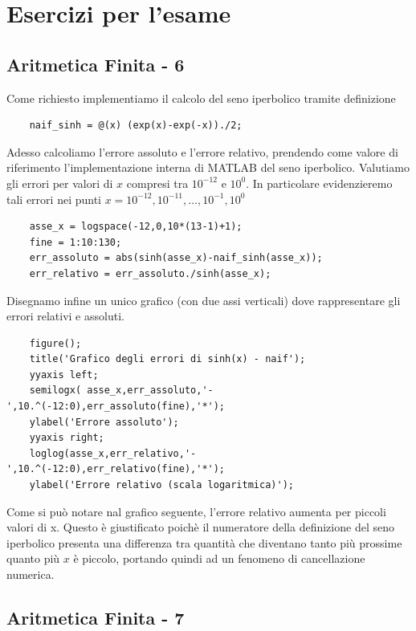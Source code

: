 \documentclass{article}
\begin{document}
\section*{Esercizi per l'esame}

\subsection*{Aritmetica Finita - 6}

Come richiesto implementiamo il calcolo del seno iperbolico tramite definizione

\begin{lstlisting}
	naif_sinh = @(x) (exp(x)-exp(-x))./2;
\end{lstlisting}

Adesso calcoliamo l'errore assoluto e l'errore relativo, prendendo come valore di riferimento l'implementazione interna di MATLAB del seno iperbolico. Valutiamo gli errori per valori di $x$ compresi tra ${10}^{-12}$ e ${10}^0$. In particolare evidenzieremo tali errori nei punti $x={10}^{-12} ,{10}^{-11} ,\ldots ,{10}^{-1} ,{10}^0$

\begin{lstlisting}
	asse_x = logspace(-12,0,10*(13-1)+1);
	fine = 1:10:130;
	err_assoluto = abs(sinh(asse_x)-naif_sinh(asse_x));
	err_relativo = err_assoluto./sinh(asse_x);
\end{lstlisting}

Disegnamo infine un unico grafico (con due assi verticali) dove rappresentare gli errori relativi e assoluti.

\begin{lstlisting}
	figure();
	title('Grafico degli errori di sinh(x) - naif');
	yyaxis left;
	semilogx( asse_x,err_assoluto,'-',10.^(-12:0),err_assoluto(fine),'*');
	ylabel('Errore assoluto');
	yyaxis right;
	loglog(asse_x,err_relativo,'-',10.^(-12:0),err_relativo(fine),'*');
	ylabel('Errore relativo (scala logaritmica)');
\end{lstlisting}

Come si può notare nal grafico seguente, l'errore relativo aumenta per piccoli valori di x. Questo è giustificato poichè il numeratore della definizione del seno iperbolico presenta una differenza tra quantità che diventano tanto più prossime quanto più $x$ è piccolo, portando quindi ad un fenomeno di cancellazione numerica.



\clearpage
\subsection*{Aritmetica Finita - 7}
\end{document}
